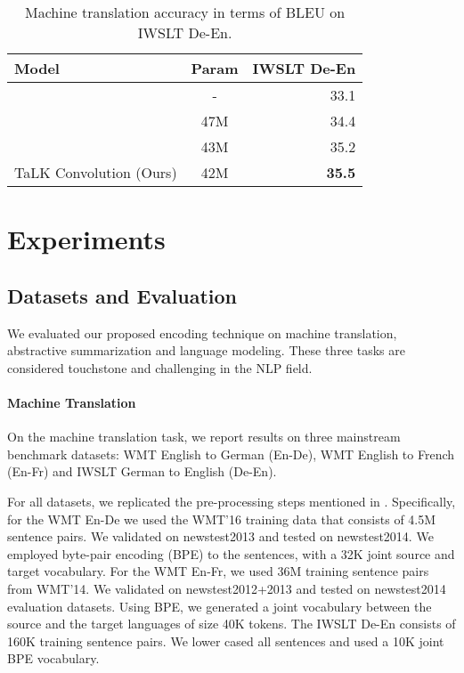 \documentclass{article}
\def\talkconvfull{TaLK Convolution}
\def\iwslt{IWSLT De-En}
\def\ende{WMT En-De}
\def\enfr{WMT En-Fr}
\begin{document}
\begin{table}[t]
\centering
\caption{Machine translation accuracy in terms of BLEU on \iwslt{}.}
\vskip 0.15in
\begin{tabular}{lcr}
\toprule
Model & Param & \iwslt{} \\
\midrule
\citet{deng2018latent} & - & 33.1 \\
\citet{vaswani2017attention} & 47M & 34.4 \\
\citet{wu2019pay} & 43M & 35.2 \\
\midrule
\talkconvfull{} (Ours) & 42M & \textbf{35.5} \\
\bottomrule
\end{tabular}
\label{tab:mt2}
\end{table}


\section{Experiments}
\subsection{Datasets and Evaluation}
\label{sec:datasets}
We evaluated our proposed encoding technique on machine translation, abstractive summarization and language modeling. These three tasks are considered touchstone and challenging in the NLP field.

\paragraph{Machine Translation} On the machine translation task, we report results on three mainstream benchmark datasets: WMT English to German (En-De), WMT English to French (En-Fr) and IWSLT German to English (De-En). 

For all datasets, we replicated the pre-processing steps mentioned in \citet{wu2019pay}. Specifically, for the \ende{} we used the WMT'16 training data that consists of 4.5M sentence pairs. We validated on newstest2013 and tested on newstest2014. We employed byte-pair encoding (BPE) \cite{DBLP:journals/corr/SennrichHB15} to the sentences, with a 32K joint source and target vocabulary. For the \enfr{}, we used 36M training sentence pairs from WMT'14. We validated on newstest2012+2013 and tested on newstest2014 evaluation datasets. Using BPE, we generated a joint vocabulary between the source and the target languages of size 40K tokens. The \iwslt{} consists of 160K training sentence pairs. We lower cased all sentences and used a 10K joint BPE vocabulary.
\end{document}
